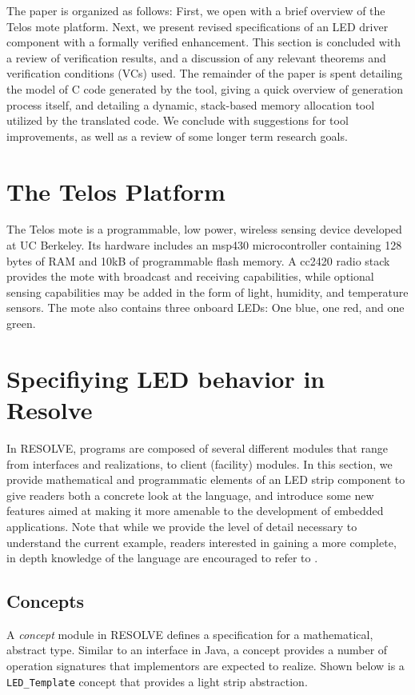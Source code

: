 \documentclass{sig-alternate}
\begin{document}
The paper is organized as follows: First, we open with a brief overview of the Telos mote platform. Next, we present revised specifications of an LED driver component with a formally verified enhancement. This section is concluded with a review of verification results, and a discussion of any relevant theorems and verification conditions (VCs) used. The remainder of the paper is spent detailing the model of C code generated by the tool, giving a quick overview of generation process itself, and detailing a dynamic, stack-based memory allocation tool utilized by the translated code. We conclude with suggestions for tool improvements, as well as a review of some longer term research goals.

\section{The Telos Platform}

The Telos mote \cite{polastre:2005} is a programmable, low power, wireless sensing device developed at UC Berkeley. Its hardware includes an msp430 microcontroller containing 128 bytes of RAM and 10kB of programmable flash memory. A cc2420 radio stack provides the mote with broadcast and receiving capabilities, while optional sensing capabilities may be added in the form of light, humidity, and temperature sensors. The mote also contains three onboard LEDs: One blue, one red, and one green.

\section{Specifiying LED behavior in Resolve}
\label{sec:specifiying}

In RESOLVE, programs are composed of several different modules that range from interfaces and realizations, to client (facility) modules. In this section, we provide mathematical and programmatic elements of an LED strip component to give readers both a concrete look at the language, and introduce some new features aimed at making it more amenable to the development of embedded applications. Note that while we provide the level of detail necessary to understand the current example, readers interested in gaining a more complete, in depth knowledge of the language are encouraged to refer to \cite{sitaraman:2011, kulczycki:2008}.

\subsection{Concepts}
\label{ssec:concepts}
A \textit{concept} module in RESOLVE defines a specification for a mathematical, abstract type. Similar to an interface in Java, a concept provides a number of operation signatures that implementors are expected to realize. Shown below is a \texttt{LED\_Template} concept that provides a light strip abstraction.
\end{document}
